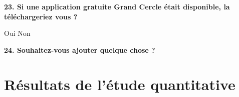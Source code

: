 \documentclass[a4paper, 11px]{article}
\begin{document}
\textbf{23. Si une application gratuite Grand Cercle était disponible, la téléchargeriez vous ? }

    Oui
    Non


\textbf{24. Souhaitez-vous ajouter quelque chose ?}
\newpage

\section{Résultats de l'étude quantitative}
\label{stats}
\end{document}
